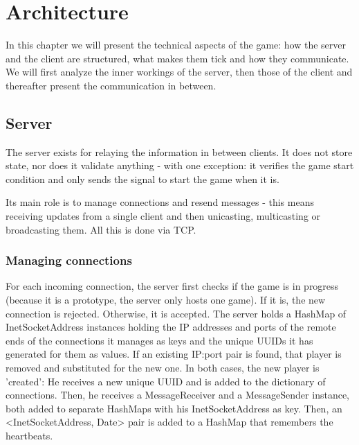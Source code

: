 \section{Architecture}

In this chapter we will present the technical aspects of the game: how the
server and the client are structured, what makes them tick and how they
communicate. We will first analyze the inner workings of the server, then those
of the client and thereafter present the communication in between.\newline

\subsection{Server}


The server exists for relaying the information in between clients. It does not
store state, nor does it validate anything - with one exception: it verifies the
game start condition and only sends the signal to start the game when it
is.\newline

Its main role is to manage connections and resend messages - this means
receiving updates from a single client and then unicasting, multicasting or
broadcasting them. All this is done via TCP.\newline

\subsubsection{Managing connections}

For each incoming connection, the server first checks if the game is in
progress (because it is a prototype, the server only hosts one game). If it is,
the new connection is rejected. Otherwise, it is accepted. The server holds a
HashMap of InetSocketAddress instances holding the IP addresses and ports of the
remote ends of the connections it manages as keys and the unique UUIDs it has
generated for them as values. If an existing IP:port pair is found, that player
is removed and substituted for the new one. In both cases, the new player is
'created': He receives a new unique UUID and is added to the dictionary of
connections. Then, he receives a MessageReceiver and a MessageSender instance,
both added to separate HashMaps with his InetSocketAddress as key. Then, an
<InetSocketAddress, Date> pair is added to a HashMap that remembers the
heartbeats.\newline

